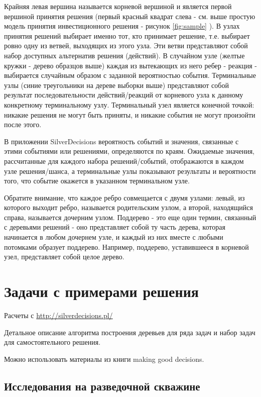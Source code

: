 Крайняя левая вершина называется корневой вершиной и является первой вершиной принятия решения (первый красный квадрат слева - см. выше простую модель принятия инвестиционного решения - рисунок \ref{fig:sample} ). В узлах принятия решений выбирает именно тот, кто принимает решение, т.е. выбирает ровно одну из ветвей, выходящих из этого узла. Эти ветви представляют собой набор доступных альтернатив решения (действий). В случайном узле (желтые кружки - дерево образцов выше) каждая из вытекающих из него ребер - реакция - выбирается случайным образом с заданной вероятностью события. Терминальные узлы (синие треугольники на дереве выборки выше) представляют собой результат последовательности действий/реакций от корневого узла к данному конкретному терминальному узлу. Терминальный узел является конечной точкой: никакие решения не могут быть приняты, и никакие события не могут произойти после этого.

В приложении SilverDecisions вероятность событий и значения, связанные с этими событиями или решениями, определяются по краям. Ожидаемые значения, рассчитанные для каждого набора решений/событий, отображаются в каждом узле решения/шанса, а терминальные узлы показывают результаты и вероятности того, что событие окажется в указанном терминальном узле.

Обратите внимание, что каждое ребро совмещается с двумя узлами: левый, из которого выходит ребро, называется родительским узлом, а второй, находящийся справа, называется дочерним узлом. Поддерево - это еще один термин, связанный с деревьями решений - оно представляет собой ту часть дерева, которая начинается в любом дочернем узле, и каждый из них вместе с любыми потомками образует поддерево. Например, поддерево, уставившееся в корневой узел, представляет собой целое дерево.




\section{Задачи с примерами решения}
Расчеты с \url{http://silverdecisions.pl/}

Детальное описание алгоритма построения деревьев для ряда задач и набор задач для самостоятельного решения.

Можно использовать материалы из книги making good decisions.

\subsection{Исследования на разведочной скважине}
    
